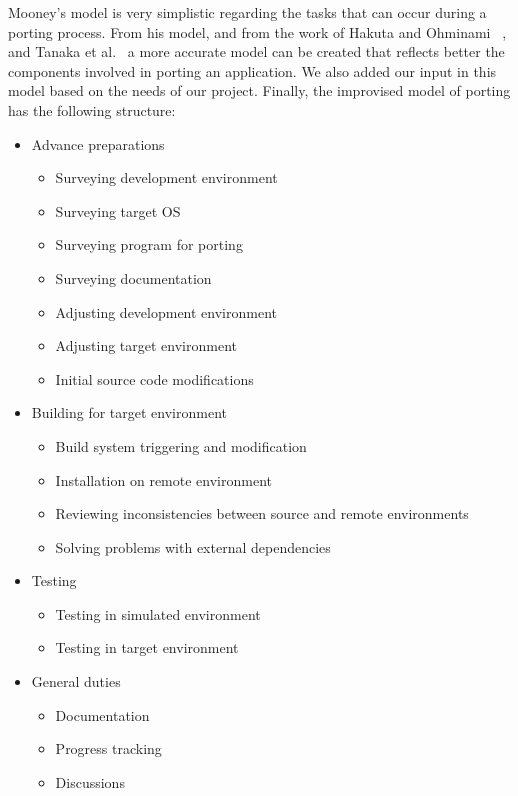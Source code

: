 Mooney's model is very simplistic regarding the tasks that can occur during
a porting process. From his model, and from the work of Hakuta and Ohminami~
\cite{hakuta}, and Tanaka et al.~\cite{tanaka} a more accurate model can be created that
reflects better the components involved in porting an application. We also added
our input in this model based on the needs of our project. Finally, the
improvised model of porting has the following structure:
\begin{itemize}
    \item Advance preparations
        \begin{itemize}
            \item Surveying development environment
            \item Surveying target OS
            \item Surveying program for porting
            \item Surveying documentation
            \item Adjusting development environment
            \item Adjusting target environment
            \item Initial source code modifications
        \end{itemize}
    \item Building for target environment
        \begin{itemize}
            \item Build system triggering and modification
            \item Installation on remote environment
            \item Reviewing inconsistencies between source and remote
            environments
            \item Solving problems with external dependencies
        \end{itemize}
    \item Testing
        \begin{itemize}
            \item Testing in simulated environment
            \item Testing in target environment
        \end{itemize}
    \item General duties
        \begin{itemize}
            \item Documentation
            \item Progress tracking
            \item Discussions
        \end{itemize}
\end{itemize}

